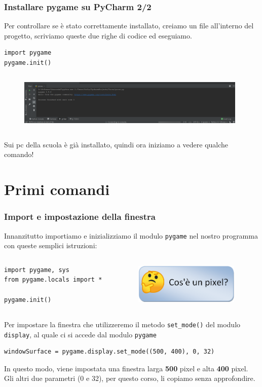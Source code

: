 \documentclass{beamer}
\begin{document}
\begin{frame}[fragile]
\frametitle{Installare pygame su PyCharm 2/2}

Per controllare se è stato correttamente installato, creiamo un file all'interno del progetto, scriviamo queste due righe di codice ed eseguiamo.
\begin{lstlisting}
import pygame
pygame.init()
		\end{lstlisting}
		\begin{figure}[t]
			\includegraphics[height=2.9cm, width=11cm]{images/PyCharmOK.png}
		\end{figure}
Sui pc della scuola è già installato, quindi ora iniziamo a vedere qualche comando!

\end{frame}

\section{Primi comandi}

\begin{frame}[fragile]
\frametitle{Import e impostazione della finestra}
	Innanzitutto importiamo e inizializziamo il modulo \texttt{pygame} nel nostro programma con queste semplici istruzioni:
	\begin{columns}[T]
		\begin{column}[T]{0.55\textwidth}
	\begin{lstlisting}
import pygame, sys
from pygame.locals import *

pygame.init()
	\end{lstlisting}
		\end{column}
\begin{column}[T]{0.45\textwidth}
	\begin{figure}[t]
		\includegraphics[height=2cm, width=5cm]{images/CosaPixel.png}
	\end{figure}
\end{column}
\end{columns}
	Per impostare la finestra che utilizzeremo il metodo \texttt{set\_mode()} del modulo \texttt{display}, al quale ci si accede dal modulo \texttt{pygame}
\begin{lstlisting}
windowSurface = pygame.display.set_mode((500, 400), 0, 32)
\end{lstlisting}
In questo modo, viene impostata una finestra larga \textbf{500} pixel e alta \textbf{400} pixel. Gli altri due parametri (0 e 32), per questo corso, li copiamo senza approfondire.
\end{frame}
\end{document}
